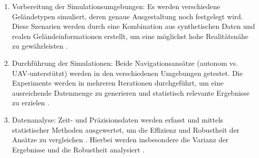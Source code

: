 \begin{enumerate}
    \item Vorbereitung der Simulationsumgebungen: 
      Es werden verschiedene Geländetypen simuliert, deren genaue Ausgestaltung noch festgelegt wird. 
      Diese Szenarien werden durch eine Kombination aus synthetischen Daten und realen Geländeinformationen erstellt, um eine möglichst hohe Realitätsnähe zu gewährleisten \cite{ugv:system:indonesia}.
    
    \item Durchführung der Simulationen: 
      Beide Navigationsansätze (autonom vs. \ac{UAV}-unterstützt) werden in den verschiedenen Umgebungen getestet. 
      Die Experimente werden in mehreren Iterationen durchgeführt, um eine ausreichende Datenmenge zu generieren und statistisch relevante Ergebnisse zu erzielen \cite{ugv:uav:cooperative:ranging}.
    
    \item Datenanalyse: 
      Zeit- und Präzisionsdaten werden erfasst und mittels statistischer Methoden ausgewertet, um die Effizienz und Robustheit der Ansätze zu vergleichen \cite{ugv:resupply:scenario}. 
      Hierbei werden insbesondere die Varianz der Ergebnisse und die Robustheit analysiert \cite{mil:ugv:attitudes}.
\end{enumerate}

